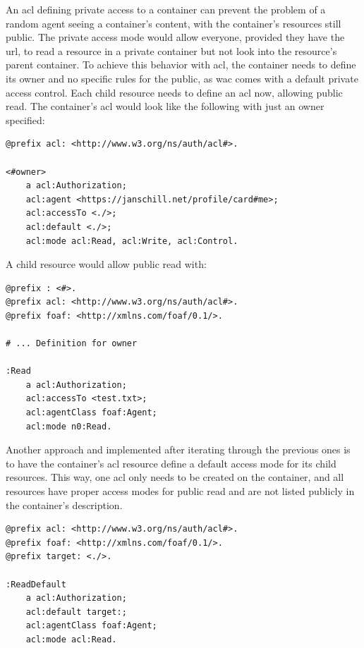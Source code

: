 An \gls{acl} defining private access to a container can prevent the problem of a random agent seeing a container's content, with the container's resources still public. The private access mode would allow everyone, provided they have the \gls{url}, to read a resource in a private container but not look into the resource’s parent container. To achieve this behavior with \gls{acl}, the container needs to define its owner and no specific rules for the public, as \gls{wac} comes with a default private access control. Each child resource needs to define an \gls{acl} now, allowing public read.
The container’s \gls{acl} would look like the following with just an owner specified:

\begin{lstlisting}[language=Other,columns=fullflexible, caption={Container \gls{acl} with owner defined.}, label={lst:container-acl-owner}]
@prefix acl: <http://www.w3.org/ns/auth/acl#>.

<#owner>
    a acl:Authorization;
    acl:agent <https://janschill.net/profile/card#me>;
    acl:accessTo <./>;
    acl:default <./>;
    acl:mode acl:Read, acl:Write, acl:Control.
\end{lstlisting}

A child resource would allow public read with:

\begin{lstlisting}[language=Other,columns=fullflexible, caption={Giving read mode to child resources}, label={lst:container-acl-read}]
@prefix : <#>.
@prefix acl: <http://www.w3.org/ns/auth/acl#>.
@prefix foaf: <http://xmlns.com/foaf/0.1/>.

# ... Definition for owner

:Read
    a acl:Authorization;
    acl:accessTo <test.txt>;
    acl:agentClass foaf:Agent;
    acl:mode n0:Read.
\end{lstlisting}

Another approach and implemented after iterating through the previous ones is to have the container’s \gls{acl} resource define a default access mode for its child resources. This way, one \gls{acl} only needs to be created on the container, and all resources have proper access modes for public read and are not listed publicly in the container’s description.

\begin{lstlisting}[language=Other,columns=fullflexible, caption={Giving default read mode to all child resources of container.}, label={lst:container-acl-read-default}]
@prefix acl: <http://www.w3.org/ns/auth/acl#>.
@prefix foaf: <http://xmlns.com/foaf/0.1/>.
@prefix target: <./>.

:ReadDefault
    a acl:Authorization;
    acl:default target:;
    acl:agentClass foaf:Agent;
    acl:mode acl:Read.
\end{lstlisting}
\vspace{0.5cm}
